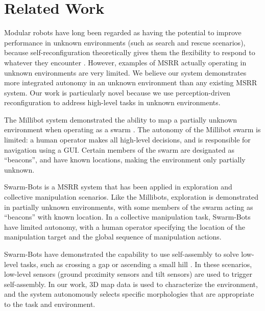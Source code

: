 \documentclass[conference]{IEEEtran}
\begin{document}
\section{Related Work}\label{sec:related-work}
%
%
Modular robots have long been regarded as having the potential to improve performance in unknown environments (such as search and rescue scenarios), because  self-reconfiguration theoretically gives them the flexibility to respond to whatever they encounter \cite{Yim2007a,yim2003modular}.  However, examples of MSRR actually operating in unknown environments are very limited. We believe our system demonstrates more integrated autonomy in an unknown environment than any existing MSRR system.  Our work is particularly novel because we use perception-driven reconfiguration to address high-level tasks in unknown environments.

The Millibot system demonstrated the ability to map a partially unknown environment when operating as a swarm \cite{Grabowski2000}. The autonomy of the Millibot swarm is limited: a human operator makes all high-level decisions, and is responsible for navigation using a GUI. Certain members of the swarm are designated as ``beacons'', and have known locations, making the environment only partially unknown.

Swarm-Bots is a MSRR system that has been applied in exploration \cite{Dorigo2005} and collective manipulation \cite{Mondada2005} scenarios.  Like the Millibots, exploration is demonstrated in partially unknown environments, with some members of the swarm acting as ``beacons'' with known location.  In a collective manipulation task, Swarm-Bots have limited autonomy, with a human operator specifying the location of the manipulation target and the global sequence of manipulation actions.

Swarm-Bots have demonstrated the capability to use self-assembly to solve low-level tasks, such as crossing a gap \cite{Mondada2004} or ascending a small hill \cite{OGrady2005}.  In these scenarios, low-level sensors (ground proximity sensors and tilt sensors) are used to trigger self-assembly.  In our work, 3D map data is used to characterize the environment, and the system autonomously selects specific morphologies that are appropriate to the task and environment. 
\end{document}
